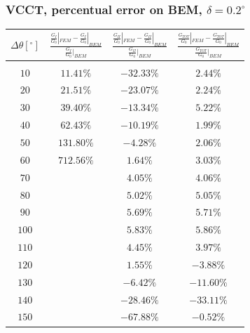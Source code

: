 \documentclass[first,firstsupp,lastsupp,handout,last,hyperref,table]{ETHclass}
\begin{document}
\begin{frame}
\frametitle{\small VCCT, percentual error on BEM, $\delta=0.2^{\circ}$}
\vspace{-0.5cm}
\scriptsize
\centering
\captionsetup[figure]{font=scriptsize,labelfont=scriptsize}
\begin{table}[htbp]
  \centering
    \begin{tabular}{cccc}
    $\Delta\theta \left[^{\circ}\right]$&$\frac{\frac{G_{I}}{G_{0}}|_{FEM}-\frac{G_{I}}{G_{0}}|_{BEM}}{\frac{G_{I}}{G_{0}}|_{BEM}}$&$\frac{\frac{G_{II}}{G_{0}}|_{FEM}-\frac{G_{II}}{G_{0}}|_{BEM}}{\frac{G_{II}}{G_{0}}|_{BEM}}$&$\frac{\frac{G_{TOT}}{G_{0}}|_{FEM}-\frac{G_{TOT}}{G_{0}}|_{BEM}}{\frac{G_{TOT}}{G_{0}}|_{BEM}}$\\
    \midrule\\
	$10$&$11.41\%$&$-32.33\%$&$2.44\%$\\
	$20$&$21.51\%$&$-23.07\%$&$2.24\%$\\
	$30$&$39.40\%$&$-13.34\%$&$5.22\%$\\
	$40$&$62.43\%$&$-10.19\%$&$1.99\%$\\
	$50$&$131.80\%$&$-4.28\%$&$2.06\%$\\
	$60$&$712.56\%$&$1.64\%$&$3.03\%$\\
	$70$&&$4.05\%$&$4.06\%$\\
	$80$&&$5.02\%$&$5.05\%$\\
	$90$&&$5.69\%$&$5.71\%$\\
	$100$&&$5.83\%$&$5.86\%$\\
	$110$&&$4.45\%$&$3.97\%$\\
	$120$&&$1.55\%$&$-3.88\%$\\
	$130$&&$-6.42\%$&$-11.60\%$\\
	$140$&&$-28.46\%$&$-33.11\%$\\
	$150$&&$-67.88\%$&$-0.52\%$\\
    \end{tabular}%
  \label{tab:phaseprop}%
\end{table}%
\end{frame}

\end{document}
